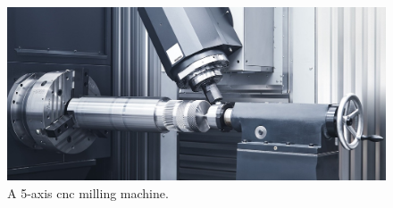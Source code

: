 \begin{figure}
  \centering
  \includegraphics[width=.7\textwidth]{images/Framework/millmachine.jpg}
  \caption{A 5-axis \gls{cnc} milling machine. \cite{FagorAutomation}}
  \label{fig:cnc}
\end{figure}


